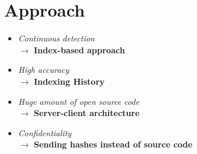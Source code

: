 
\section{Approach}

\begin{frame}{\insertsection}
	\begin{itemize}
		\setlength{\itemsep}{8pt}
		\item \textit{Continuous detection} \onslide<2->\\
			$\rightarrow$ \textbf{Index-based approach}\onslide<3->
		\item \textit{High accuracy}\onslide<4->\\
			$\rightarrow$ \textbf{Indexing History}\onslide<5->
		\item \textit{Huge amount of open source code}\onslide<6->\\
			$\rightarrow$ \textbf{Server-client architecture}\onslide<7->
		\item \textit{Confidentiality}\onslide<8->\\
			$\rightarrow$ \textbf{Sending hashes instead of source code}\onslide<9->
	\end{itemize}
\end{frame}


